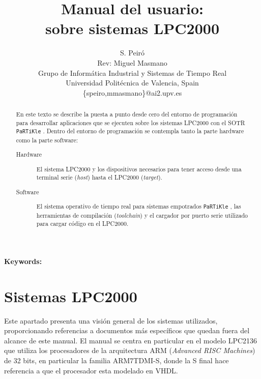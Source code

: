 \documentclass[10pt,a4paper]{article}
\title{Manual del usuario:\\
	\partikle{} sobre sistemas LPC2000}
\author {S. Peiró\\ \small{Rev: Miguel Masmano}\\%
	Grupo de Informática Industrial y Sistemas de Tiempo Real\\
	Universidad Politécnica de Valencia, Spain\\
\{speiro,mmasmano\}@ai2.upv.es
}
\newcommand{\partikle}[0]{\texttt{PaRTiKle}}
\begin{document}
\maketitle

\begin{abstract}
	En este texto se describe la puesta a punto desde cero del entorno de programación para desarrollar aplicaciones que se ejecuten sobre los sistemas LPC2000 con el SOTR \partikle{} \cite{partikleos}.
	Dentro del entorno de programación se contempla tanto la parte hardware como la parte software:
	
	 \begin{description}
	 \item[Hardware]
	 El sistema LPC2000 y los dispositivos necesarios para tener acceso desde una terminal serie (\emph{host}) hasta el LPC2000 (\emph{target}). 


	 \item[Software]
	 El sistema operativo de tiempo real para sistemas empotrados \partikle{} \cite{partikleos}, las herramientas de compilación (\emph{toolchain}) y el cargador por puerto serie utilizado para cargar código en el LPC2000.
	 \end{description}

\end{abstract}

\begin{center}
\textbf{Keywords:}
\end{center}

\tableofcontents

\newpage

\section{Sistemas LPC2000}

	Este apartado presenta una visión general de los sistemas utilizados, proporcionando referencias a documentos más específicos que quedan fuera del alcance de este manual.  El manual se centra en particular en el modelo LPC2136 que utiliza los procesadores de la arquitectura ARM (\emph{Advanced RISC Machines}) de 32 bits, en particular la familia ARM7TDMI-S, donde la S final hace referencia a que el procesador esta modelado en VHDL.
	
\end{document}

